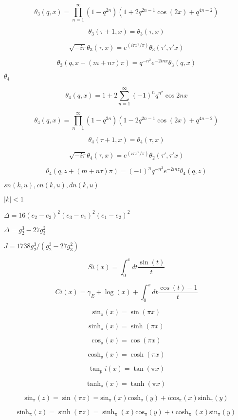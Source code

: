 \documentclass{article}
\begin{document}
\[ \theta_3(q,x) = \prod_{n=1}^{\infty} (1 - q^{2n})(1 + 2q^{2n-1}\cos(2x) + q^{4n-2}) \]
\pagebreak

\[ \theta_3(\tau+1,x) = \theta_3(\tau,x) \]
\pagebreak

\[ \sqrt{-i\tau}\theta_3(\tau,x) = e^{(i\tau x^2/\pi)}\theta_3(\tau',\tau' x) \]
\pagebreak

\[ \theta_3(q, x + (m+n\tau)\pi) = q^{-n^2} e^{-2inx} \theta_3(q, x) \]
\pagebreak

$ \theta_4 $
\pagebreak

\[ \theta_4(q,x) = 1 + 2\sum_{n=1}^{\infty}(-1)^n q^{n^2}\cos{2nx} \]
\pagebreak

\[ \theta_4(q,x) = \prod_{n=1}^{\infty} (1 - q^{2n})(1 - 2q^{2n-1}\cos(2x) + q^{4n-2}) \]
\pagebreak

\[ \theta_4(\tau+1,x) = \theta_4(\tau,x) \]
\pagebreak

\[ \sqrt{-i\tau}\theta_4(\tau,x) = e^{(i\tau x^2/\pi)}\theta_2(\tau',\tau' x) \]
\pagebreak

\[ \theta_4(q, z+(m + n\tau)\pi) = (-1)^n q^{-n^2}e^{-2inz}\theta_4(q, z) \]
\pagebreak

$ sn(k, u), cn(k, u), dn(k, u) $
\pagebreak

$ |k| < 1 $
\pagebreak

$ \Delta = 16(e_2 - e_3)^2(e_3 - e_1)^2(e_1 - e_2)^2 $
\pagebreak

$ \Delta = g_2^3 - 27 g_3^2 $
\pagebreak

$ J = 1738 g_2^3 / (g_2^3 - 27 g_3^2) $
\pagebreak

\[ Si(x) = \int_0^x dt \frac{\sin(t)}{t} \]
\pagebreak

\[ Ci(x) = \gamma_E + \log(x) + \int_0^x dt \frac{\cos(t) - 1}{t} \]
\pagebreak

\[ \mathrm{sin_\pi}(x) = \sin(\pi x) \]
\pagebreak

\[ \mathrm{sinh_\pi}(x) = \sinh(\pi x) \]
\pagebreak

\[ \mathrm{cos_\pi}(x) = \cos(\pi x) \]
\pagebreak

\[ \mathrm{cosh_\pi}(x) = \cosh(\pi x) \]
\pagebreak

\[ \tan_pi(x) = \tan(\pi x) \]
\pagebreak

\[ \mathrm{tanh_\pi}(x) = \tanh(\pi x) \]
\pagebreak

\[ \mathrm{sin_\pi}(z) = \sin(\pi z) = \mathrm{sin_\pi}(x) \mathrm{cosh_\pi}(y) + i \mathrm{cos_\pi}(x) \mathrm{sinh_\pi}(y) \]
\pagebreak

\[ \mathrm{sinh_\pi}(z) = \sinh(\pi z) = \mathrm{\sinh_\pi}(x) \mathrm{cos_\pi}(y) + i \mathrm{\cosh_\pi}(x) \mathrm{sin_\pi}(y) \]
\pagebreak
\end{document}
